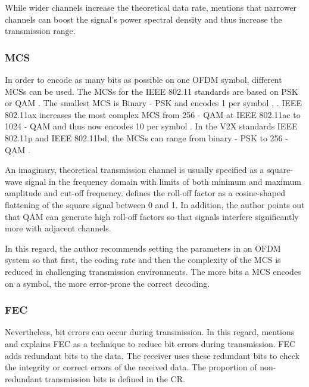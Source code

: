 While wider channels increase the theoretical data rate, \textcite{avallone_will_2021} mentions that narrower channels can
boost the signal's power spectral density and thus increase the transmission range.

\subsubsection*{\acf{MCS}}

In order to encode as many bits as possible on one \ac{OFDM} symbol, different \ac{MCS}s can be used.
The \ac{MCS}s for the IEEE 802.11 standards are based on \ac{PSK} or \ac{QAM} \cite[305]{sauter_wireless_2022}.
The smallest \ac{MCS} is Binary - \ac{PSK} and encodes \SI{1}{\bit} per symbol \cite[140]{kauffels_wireless_2002}, \cite[304]{sauter_wireless_2022}.
IEEE 802.11ax increases the most complex \ac{MCS} from \num{256} - \ac{QAM} at IEEE 802.11ac to \num{1024} - \ac{QAM} and thus now encodes \SI{10}{\bit} per symbol \cite{afaqui_ieee_2017}.
In the \ac{V2X} standards IEEE 802.11p and IEEE 802.11bd, the \ac{MCS}s can range from binary - \ac{PSK} to \num{256} - \ac{QAM} \cite{jacob_system-level_2020}.

An imaginary, theoretical transmission channel is usually specified as a square-wave signal in the frequency domain
with limits of both minimum and maximum amplitude and cut-off frequency. \textcite[158,159]{kauffels_wireless_2002} defines
the roll-off factor as a cosine-shaped flattening of the square signal between 0 and 1.
In addition, the author points
out that \ac{QAM} can generate high roll-off factors so that signals interfere significantly more with adjacent channels.

In this regard, the author recommends setting the parameters in an \ac{OFDM} system so that first, the coding
rate and then the complexity of the \ac{MCS} is reduced in challenging transmission environments. The more bits a \ac{MCS} encodes
on a symbol, the more error-prone the correct decoding.

\subsubsection*{\acf{FEC}}

Nevertheless, bit errors can occur during transmission. In this regard, \textcite[135]{kauffels_wireless_2002}
mentions and explains \ac{FEC} as a technique to reduce bit errors during transmission. \ac{FEC} adds redundant bits
to the data. The receiver uses these redundant bits to check the integrity or correct errors of the received data.
The proportion of non-redundant transmission bits is defined in the \ac{CR}.

